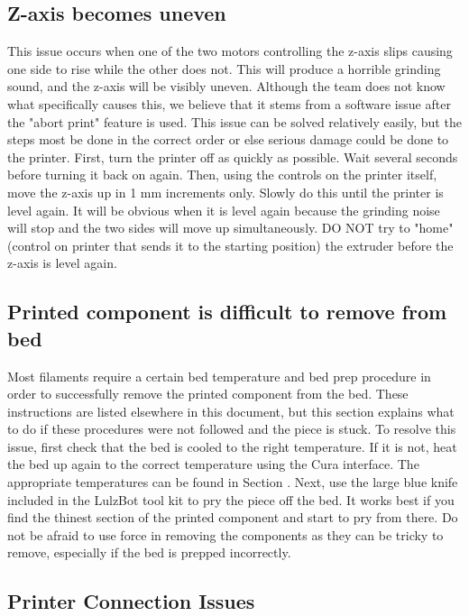 \documentclass{article}
\begin{document}
\subsection{Z-axis becomes uneven}

This issue occurs when one of the two motors controlling the z-axis slips causing one side to rise while the other does not. This will produce a horrible grinding sound, and the z-axis will be visibly uneven. Although the team does not know what specifically causes this, we believe that it stems from a software issue after the "abort print" feature is used. This issue can be solved relatively easily, but the steps most be done in the correct order or else serious damage could be done to the printer. First, turn the printer off as quickly as possible. Wait several seconds before turning it back on again. Then, using the controls on the printer itself, move the z-axis up in 1 mm increments only. Slowly do this until the printer is level again. It will be obvious when it is level again because the grinding noise will stop and the two sides will move up simultaneously. DO NOT try to "home" (control on printer that sends it to the starting position) the extruder before the z-axis is level again. 

\subsection{Printed component is difficult to remove from bed}

Most filaments require a certain bed temperature and bed prep procedure in order to successfully remove the printed component from the bed. These instructions are listed elsewhere in this document, but this section explains what to do if these procedures were not followed and the piece is stuck. To resolve this issue, first check that the bed is cooled to the right temperature. If it is not, heat the bed up again to the correct temperature using the Cura interface. The appropriate temperatures can be found in Section  . Next, use the large blue knife included in the LulzBot tool kit to pry the piece off the bed. It works best if you find the thinest section of the printed component and start to pry from there. Do not be afraid to use force in removing the components as they can be tricky to remove, especially if the bed is prepped incorrectly. 

\subsection{Printer Connection Issues}
\end{document}
